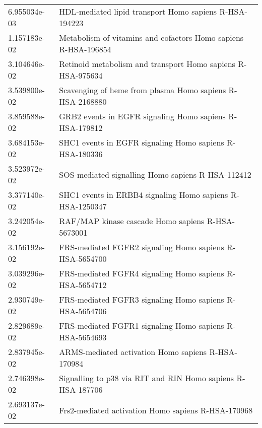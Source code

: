 \begin{longtable}{p{2.4cm}p{14.5cm}}
             6.955034e-03 &                                        HDL-mediated lipid transport Homo sapiens R-HSA-194223 \\
             1.157183e-02 &                                Metabolism of vitamins and cofactors Homo sapiens R-HSA-196854 \\
             3.104646e-02 &                                   Retinoid metabolism and transport Homo sapiens R-HSA-975634 \\
             3.539800e-02 &                                     Scavenging of heme from plasma Homo sapiens R-HSA-2168880 \\
             3.859588e-02 &                                       GRB2 events in EGFR signaling Homo sapiens R-HSA-179812 \\
             3.684153e-02 &                                       SHC1 events in EGFR signaling Homo sapiens R-HSA-180336 \\
             3.523972e-02 &                                             SOS-mediated signalling Homo sapiens R-HSA-112412 \\
             3.377140e-02 &                                     SHC1 events in ERBB4 signaling Homo sapiens R-HSA-1250347 \\
             3.242054e-02 &                                             RAF/MAP kinase cascade Homo sapiens R-HSA-5673001 \\
             3.156192e-02 &                                       FRS-mediated FGFR2 signaling Homo sapiens R-HSA-5654700 \\
             3.039296e-02 &                                       FRS-mediated FGFR4 signaling Homo sapiens R-HSA-5654712 \\
             2.930749e-02 &                                       FRS-mediated FGFR3 signaling Homo sapiens R-HSA-5654706 \\
             2.829689e-02 &                                       FRS-mediated FGFR1 signaling Homo sapiens R-HSA-5654693 \\
             2.837945e-02 &                                            ARMS-mediated activation Homo sapiens R-HSA-170984 \\
             2.746398e-02 &                                   Signalling to p38 via RIT and RIN Homo sapiens R-HSA-187706 \\
             2.693137e-02 &                                            Frs2-mediated activation Homo sapiens R-HSA-170968 \\

\end{longtable}
